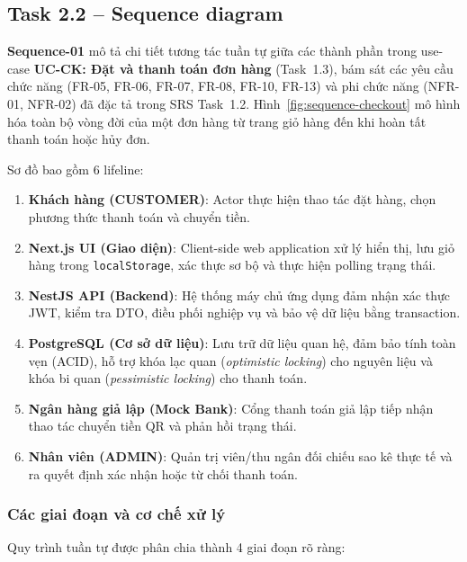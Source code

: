\subsection{Task 2.2 -- Sequence diagram}

\textbf{Sequence-01} mô tả chi tiết tương tác tuần tự giữa các thành phần trong use-case \textbf{UC-CK: Đặt và thanh toán đơn hàng} (Task~1.3), bám sát các yêu cầu chức năng (FR-05, FR-06, FR-07, FR-08, FR-10, FR-13) và phi chức năng (NFR-01, NFR-02) đã đặc tả trong SRS Task~1.2.
Hình~\ref{fig:sequence-checkout} mô hình hóa toàn bộ vòng đời của một đơn hàng từ trang giỏ hàng đến khi hoàn tất thanh toán hoặc hủy đơn.

Sơ đồ bao gồm 6 lifeline:
\begin{enumerate}
  \item \textbf{Khách hàng (CUSTOMER)}: Actor thực hiện thao tác đặt hàng, chọn phương thức thanh toán và chuyển tiền.
  \item \textbf{Next.js UI (Giao diện)}: Client-side web application xử lý hiển thị, lưu giỏ hàng trong \texttt{localStorage}, xác thực sơ bộ và thực hiện polling trạng thái.
  \item \textbf{NestJS API (Backend)}: Hệ thống máy chủ ứng dụng đảm nhận xác thực JWT, kiểm tra DTO, điều phối nghiệp vụ và bảo vệ dữ liệu bằng transaction.
  \item \textbf{PostgreSQL (Cơ sở dữ liệu)}: Lưu trữ dữ liệu quan hệ, đảm bảo tính toàn vẹn (ACID), hỗ trợ khóa lạc quan (\emph{optimistic locking}) cho nguyên liệu và khóa bi quan (\emph{pessimistic locking}) cho thanh toán.
  \item \textbf{Ngân hàng giả lập (Mock Bank)}: Cổng thanh toán giả lập tiếp nhận thao tác chuyển tiền QR và phản hồi trạng thái.
  \item \textbf{Nhân viên (ADMIN)}: Quản trị viên/thu ngân đối chiếu sao kê thực tế và ra quyết định xác nhận hoặc từ chối thanh toán.
\end{enumerate}

\subsubsection{Các giai đoạn và cơ chế xử lý}

Quy trình tuần tự được phân chia thành 4 giai đoạn rõ ràng:

